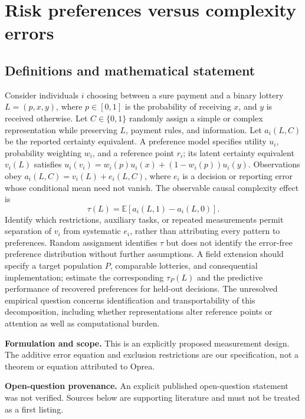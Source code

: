 \documentclass[11pt]{article}
\begin{document}
\section*{Risk preferences versus complexity errors}\label{30007582}
\subsection{Definitions and mathematical statement}
Consider individuals \(i\) choosing between a sure payment and a binary lottery \(L=(p,x,y)\), where \(p\in[0,1]\) is the probability of receiving \(x\), and \(y\) is received otherwise. Let \(C\in\{0,1\}\) randomly assign a simple or complex representation while preserving \(L\), payment rules, and information. Let \(a_i(L,C)\) be the reported certainty equivalent. A preference model specifies utility \(u_i\), probability weighting \(w_i\), and a reference point \(r_i\); its latent certainty equivalent \(v_i(L)\) satisfies \(u_i(v_i)=w_i(p)u_i(x)+(1-w_i(p))u_i(y)\). Observations obey \(a_i(L,C)=v_i(L)+e_i(L,C)\), where \(e_i\) is a decision or reporting error whose conditional mean need not vanish. The observable causal complexity effect is
\[\tau(L)=\mathbb E[a_i(L,1)-a_i(L,0)].\]
Identify which restrictions, auxiliary tasks, or repeated measurements permit separation of \(v_i\) from systematic \(e_i\), rather than attributing every pattern to preferences. Random assignment identifies \(\tau\) but does not identify the error-free preference distribution without further assumptions. A field extension should specify a target population \(P\), comparable lotteries, and consequential implementation; estimate the corresponding \(\tau_P(L)\) and the predictive performance of recovered preferences for held-out decisions. The unresolved empirical question concerns identification and transportability of this decomposition, including whether representations alter reference points or attention as well as computational burden.

\par\textbf{Formulation and scope.} This is an explicitly proposed measurement design. The additive error equation and exclusion restrictions are our specification, not a theorem or equation attributed to Oprea.

\par\textbf{Open-question provenance.} An explicit published open-question statement was not verified. Sources below are supporting literature and must not be treated as a first listing.
\end{document}
